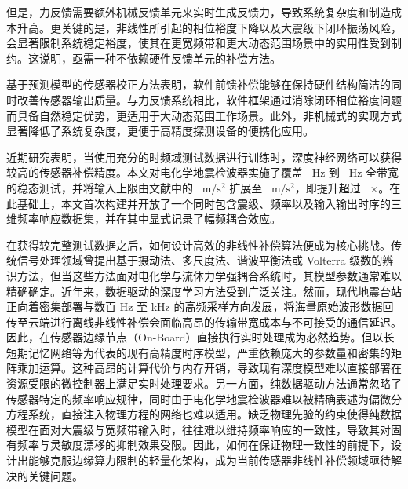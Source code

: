 \documentclass[sn-nature]{sn-jnl}
\newif\ifCNENEnglish
\newif\ifCNENBilingual
\newcommand{\CNEN}[2]{%
    \ifCNENBilingual
        #1%
        \if\relax\detokenize{#2}\relax\else\par #2\fi%
    \else
        \ifCNENEnglish
            #2%
        \else
            #1%
        \fi
    \fi
}
\begin{document}
\CNEN{但是，力反馈需要额外机械反馈单元来实时生成反馈力，导致系统复杂度和制造成本升高。更关键的是，非线性所引起的相位裕度下降以及大震级下闭环振荡风险，会显著限制系统稳定裕度，使其在更宽频带和更大动态范围场景中的实用性受到制约。这说明，亟需一种不依赖硬件反馈单元的补偿方法。}{}

\CNEN{基于预测模型的传感器校正方法\cite{WOS:001409548400009}表明，软件前馈补偿能够在保持硬件结构简洁的同时改善传感器输出质量。与力反馈系统相比，软件框架通过消除闭环相位裕度问题而具备自然稳定优势，更适用于大动态范围工作场景。此外，非机械式的实现方式显著降低了系统复杂度，更便于高精度探测设备的便携化应用。}{}

\CNEN{近期研究表明，当使用充分的时频域测试数据进行训练时，深度神经网络可以获得较高的传感器补偿精度\cite{HOFLER2024136528}。本文对电化学地震检波器实施了覆盖 \valFreqScanStart~Hz 到 \valFreqScanEnd~Hz 全带宽的稳态测试，并将输入上限由文献\cite{WOS:000408118700046}中的 \valSunForceAcc~$\text{m}/\text{s}^2$ 扩展至 \valMagScanEnd~$\text{m}/\text{s}^2$，即提升超过 \valInputGainExpansion~$\times$。在此基础上，本文首次构建并开放了一个同时包含震级、频率以及输入输出时序的三维频率响应数据集，并在其中显式记录了幅频耦合效应。}{}

\CNEN{在获得较完整测试数据之后，如何设计高效的非线性补偿算法便成为核心挑战。传统信号处理领域曾提出基于摄动法\cite{royOptimalModifiedHomotopy2023}、多尺度法\cite{jainModelOrderReduction2020}、谐波平衡法\cite{shawHybridAveragingHarmonic2023}或 Volterra 级数\cite{helieInputOutputReduced2021}的辨识方法，但当这些方法面对电化学与流体力学强耦合系统时，其模型参数通常难以精确确定。近年来，数据驱动的深度学习方法受到广泛关注\cite{anandanatarajanDeepNeuralNetworkBased2023}。然而，现代地震台站正向着密集部署与数百 Hz 至 kHz 的高频采样方向发展，将海量原始波形数据回传至云端进行离线非线性补偿会面临高昂的传输带宽成本与不可接受的通信延迟。因此，在传感器边缘节点（On-Board）直接执行实时处理成为必然趋势。但以长短期记忆网络等为代表的现有高精度时序模型，严重依赖庞大的参数量和密集的矩阵乘加运算\cite{zhaoDetectingEarlyDamages2020, thangamalarLinearisationFlowSensors2023}。这种高昂的计算代价与内存开销，导致现有深度模型难以直接部署在资源受限的微控制器上满足实时处理要求。另一方面，纯数据驱动方法通常忽略了传感器特定的频率响应规律，同时由于电化学地震检波器难以被精确表述为偏微分方程系统，直接注入物理方程的网络\cite{wangEigenvectorBiasFourier2021}也难以适用。缺乏物理先验的约束使得纯数据模型在面对大震级与宽频带输入时，往往难以维持频率响应的一致性，导致其对固有频率与灵敏度漂移的抑制效果受限。因此，如何在保证物理一致性的前提下，设计出能够克服边缘算力限制的轻量化架构，成为当前传感器非线性补偿领域亟待解决的关键问题。}{}
\end{document}

